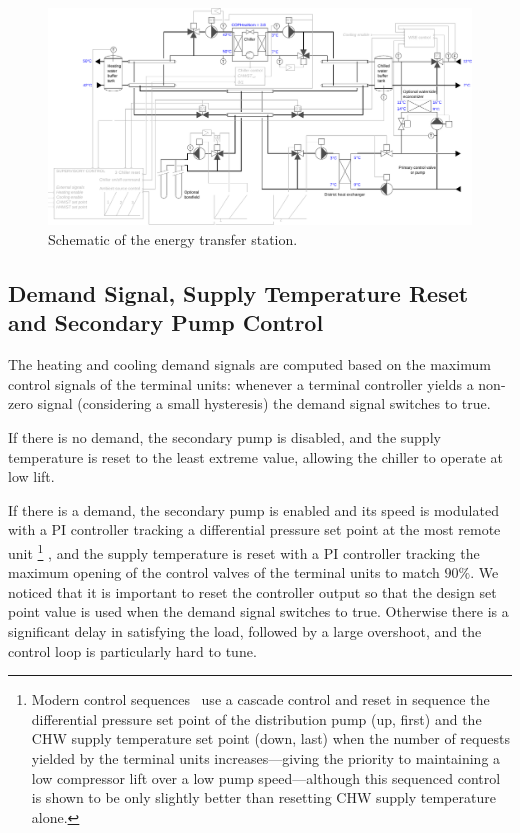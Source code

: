 \begin{figure}[!htbp]
\centering
\includegraphics[width=\linewidth]{figures/ChillerBorefield.pdf}
\caption{Schematic of the energy transfer station.}
\label{fig:schematic}
\end{figure}


\subsection{Demand Signal, Supply Temperature Reset and Secondary Pump Control} \label{sec:demand}

The heating and cooling demand signals are computed based on the maximum control signals of the terminal units: whenever a terminal controller yields a non-zero signal (considering a small hysteresis) the demand signal switches to true.

If there is no demand, the secondary pump is disabled, and the supply temperature is reset to the least extreme value, allowing the chiller to operate at low lift.

If there is a demand, the secondary pump is enabled and its speed is modulated with a PI controller tracking a differential pressure set point at the most remote unit%
\footnote{Modern control sequences~\cite{Llp2019} use a cascade control and reset in sequence the differential pressure set point of the distribution pump (up, first) and the CHW supply temperature set point (down, last) when the number of requests yielded by the terminal units increases---giving the priority to maintaining a low compressor lift over a low pump speed---although this sequenced control is
shown to be only slightly better than resetting CHW supply temperature alone.}%
, and the supply temperature is reset with a PI controller tracking the maximum opening of the control valves of the terminal units to match $90\%$.
We noticed that it is important to reset the controller output so that the design set point value is used when the demand signal switches to true. Otherwise there is a significant delay in satisfying the load, followed by a large overshoot, and the control loop is particularly hard to tune.

